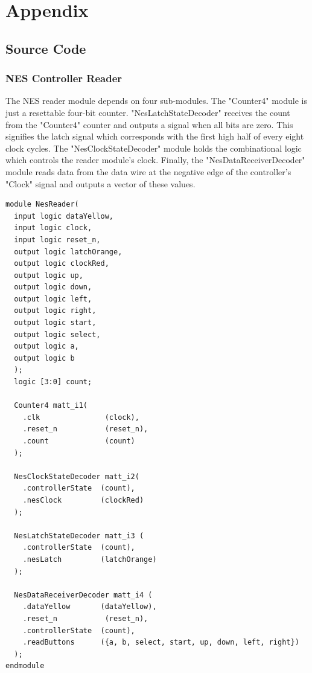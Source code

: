 \documentclass[a4paper]{article}
\begin{document}
\section{Appendix}

\subsection{Source Code}%

\subsubsection{NES Controller Reader}
The NES reader module depends on four sub-modules. 
The "Counter4" module is just a resettable four-bit counter.
"NesLatchStateDecoder" receives the count from the "Counter4" counter and outputs a signal when all bits are zero. This signifies the latch signal which corresponds with the first high half of every eight clock cycles.
The "NesClockStateDecoder" module holds the combinational logic which controls the reader module's clock. 
Finally, the "NesDataReceiverDecoder" module reads data from the data wire at the negative edge of the controller's "Clock" signal and outputs a vector of these values. 


\begin{Verbatim}[tabsize = 4]
module NesReader(
  input logic dataYellow,
  input logic clock,
  input logic reset_n,
  output logic latchOrange,
  output logic clockRed,
  output logic up,
  output logic down,
  output logic left,
  output logic right,
  output logic start,
  output logic select,
  output logic a,
  output logic b
  );
  logic [3:0] count;

  Counter4 matt_i1(
    .clk               (clock), 
    .reset_n           (reset_n), 
    .count             (count)
  );

  NesClockStateDecoder matt_i2(
    .controllerState  (count), 
    .nesClock         (clockRed)
  );

  NesLatchStateDecoder matt_i3 (
    .controllerState  (count), 
    .nesLatch         (latchOrange)
  );

  NesDataReceiverDecoder matt_i4 (
    .dataYellow       (dataYellow), 
    .reset_n           (reset_n),
    .controllerState  (count), 
    .readButtons      ({a, b, select, start, up, down, left, right})
  );
endmodule

\end{Verbatim}
\end{document}
